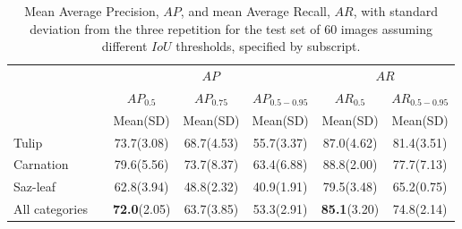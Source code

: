 \documentclass[11pt]{article}
\begin{document}
\begin{table}[H]
\centering
\caption{Mean Average Precision, $AP$, and mean Average Recall, $AR$, with standard deviation from the three repetition for the test set of 60 images assuming different $IoU$ thresholds, specified by subscript.}
\begin{tabular}{lcccccc}
\hhline{~~-----}
& & \multicolumn{3}{c}{$AP$} & \multicolumn{2}{c}{$AR$} \\ 
\hhline{~~-----}
& & $AP_{0.5}$ & $AP_{0.75}$ & $AP_{0.5-0.95}$ & $AR_{0.5}$ & $AR_{0.5-0.95}$\\ 
& & Mean(SD) & Mean(SD) & Mean(SD) & Mean(SD) & Mean(SD) \\ 
\hline
Tulip & & 73.7(3.08) & 68.7(4.53) & 55.7(3.37) & 87.0(4.62) & 81.4(3.51)\\ 
Carnation & & 79.6(5.56) & 73.7(8.37) & 63.4(6.88) & 88.8(2.00) & 77.7(7.13)\\ 
Saz-leaf & & 62.8(3.94) & 48.8(2.32) & 40.9(1.91) & 79.5(3.48) & 65.2(0.75)\\ 
All categories & & \textbf{72.0}(2.05) & 63.7(3.85) & 53.3(2.91) & \textbf{85.1}(3.20)& 74.8(2.14)\\
\hline
\end{tabular}
\label{Tab:AP}
\end{table}
\end{document}
